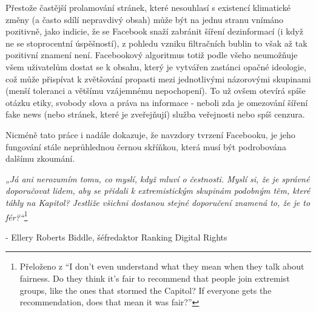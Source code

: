Přestože častější prolamování stránek, které nesouhlasí s existencí klimatické změny (a často sdílí nepravdivý obsah) může být na jednu stranu vnímáno pozitivně, jako indicie, že se Facebook snaží zabránit šíření dezinformací (i když ne se stoprocentní úspěšností), z pohledu vzniku filtračních bublin to však až tak pozitivní znamení není. Facebookový algoritmus totiž podle všeho neumožňuje všem uživatelům dostat se k obsahu, který je vytvářen zastánci opačné ideologie, což může přispívat k zvětšování propasti mezi jednotlivými názorovými skupinami (menší toleranci a většímu vzájemnému nepochopení). To už ovšem otevírá spíše otázku etiky, svobody slova a práva na informace - neboli zda je omezování šíření fake news (nebo stránek, které je zveřejňují) služba veřejnosti nebo spíš cenzura. 

Nicméně tato práce i nadále dokazuje, že navzdory tvrzení Facebooku, je jeho fungování stále neprůhlednou černou skříňkou, která musí být podrobována dalšímu zkoumání. 

\setlength\parskip{5mm}
\begin{flushright}
   \textit{„Já ani nerozumím tomu, co myslí, když mluví o čestnosti. Myslí si, že je správné doporučovat lidem, aby se přidali k extremistickým skupinám podobným těm, které táhly na Kapitol? Jestliže všichni dostanou stejné doporučení znamená to, že je to fér?“}\footnote{Přeloženo z “I don’t even understand what they mean when they talk about fairness. Do they think it’s fair to recommend that people join extremist groups, like the ones that stormed the Capitol? If everyone gets the recommendation, does that mean it was fair?”} 
    
    - Ellery Roberts Biddle, šéfredaktor Ranking Digital Rights
    \end{flushright}
    

